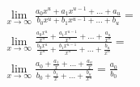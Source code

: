 \begin{ex}
\begin{align}
&\lim_{x\rightarrow \infty} \frac{a_0x^u+a_1x^{u-1}+\dots+a_u}{b_0x^u+b_1x^{u-1}+\dots+b_u}=\nonumber\\
&\lim_{x\rightarrow \infty} \frac{\frac{a_0x^u}{x^u}+\frac{a_1x^{u-1}}{x^u}+\dots+\frac{a_u}{x^u}}{\frac{b_0x^u}{x^u}+\frac{b_1x^{u-1}}{x^u}+\dots+\frac{b_u}{x^u}}=\nonumber\\
&\lim_{x\rightarrow \infty} \frac{a_0+\frac{a_1}{x}+\dots+\frac{a_u}{x}}{b_0+\frac{b_1}{x}+\dots+\frac{b_u}{x^u}}
=\frac{a_0}{b_0}\nonumber
\end{align}
\end{ex}